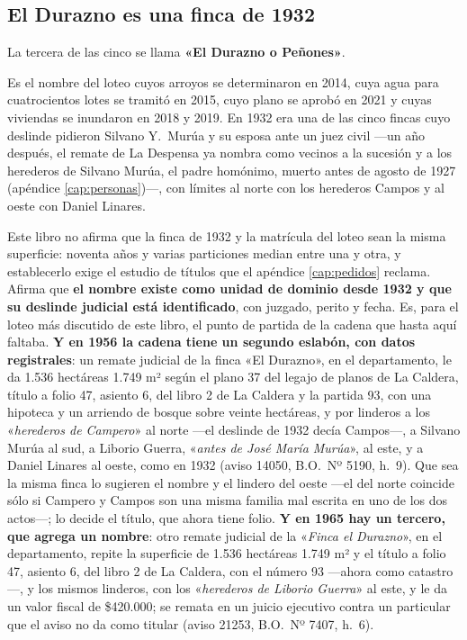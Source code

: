 \subsection*{El Durazno es una finca de 1932}

La tercera de las cinco se llama \textbf{«El Durazno o Peñones»}.

Es el nombre del loteo cuyos arroyos se determinaron en 2014, cuya agua para cuatrocientos
lotes se tramitó en 2015, cuyo plano se aprobó en 2021 y cuyas viviendas se inundaron en
2018 y 2019. En 1932 era una de las cinco fincas cuyo deslinde pidieron Silvano Y.\ Murúa y su esposa ante un juez civil ---un año después, el remate de La Despensa ya nombra como vecinos a la sucesión y a los herederos de Silvano Murúa, el padre homónimo, muerto antes de agosto de 1927 (apéndice \ref{cap:personas})---, con
límites al norte con los herederos Campos y al oeste con Daniel Linares.

Este libro no afirma que la finca de 1932 y la matrícula del loteo sean la misma superficie:
noventa años y varias particiones median entre una y otra, y establecerlo exige el estudio
de títulos que el apéndice \ref{cap:pedidos} reclama. Afirma que \textbf{el nombre existe como unidad de
dominio desde 1932 y que su deslinde judicial está identificado}, con juzgado, perito y
fecha. Es, para el loteo más discutido de este libro, el punto de partida de la cadena que
hasta aquí faltaba. \textbf{Y en 1956 la cadena tiene un segundo eslabón, con datos registrales}: un remate judicial de la finca «El Durazno», en el departamento, le da 1.536 hectáreas 1.749 m² según el plano 37 del legajo de planos de La Caldera, título a folio 47, asiento 6, del libro 2 de La Caldera y la partida 93, con una hipoteca y un arriendo de bosque sobre veinte hectáreas, y por linderos a los «\textit{herederos de Campero}» al norte ---el deslinde de 1932 decía Campos---, a Silvano Murúa al sud, a Liborio Guerra, «\textit{antes de José María Murúa}», al este, y a Daniel Linares al oeste, como en 1932 (aviso 14050, B.O.\ Nº 5190, h.\ 9). Que sea la misma finca lo sugieren el nombre y el lindero del oeste ---el del norte coincide sólo si Campero y Campos son una misma familia mal escrita en uno de los dos actos---; lo decide el título, que ahora tiene folio. \textbf{Y en 1965 hay un tercero, que agrega un nombre}: otro remate judicial de la «\textit{Finca el Durazno}», en el departamento, repite la superficie de 1.536 hectáreas 1.749 m² y el título a folio 47, asiento 6, del libro 2 de La Caldera, con el número 93 ---ahora como catastro---, y los mismos linderos, con los «\textit{herederos de Liborio Guerra}» al este, y le da un valor fiscal de \$420.000; se remata en un juicio ejecutivo contra un particular que el aviso no da como titular (aviso 21253, B.O.\ Nº 7407, h.\ 6).

